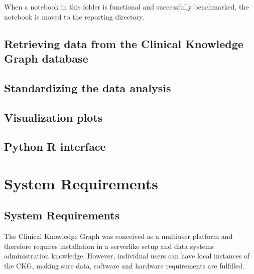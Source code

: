 \documentclass[letterpaper,10pt,english]{sphinxmanual}
\begin{document}
When a notebook in this folder is functional and successfully benchmarked, the notebook is moved to the reporting directory.


\section{Retrieving data from the Clinical Knowledge Graph database}
\label{\detokenize{advanced_features/ckg-queries:retrieving-data-from-the-clinical-knowledge-graph-database}}\label{\detokenize{advanced_features/ckg-queries::doc}}

\section{Standardizing the data analysis}
\label{\detokenize{advanced_features/standard-analysis:standardizing-the-data-analysis}}\label{\detokenize{advanced_features/standard-analysis::doc}}

\section{Visualization plots}
\label{\detokenize{advanced_features/visualization-plots:visualization-plots}}\label{\detokenize{advanced_features/visualization-plots::doc}}

\section{Python \sphinxhyphen{} R interface}
\label{\detokenize{advanced_features/R-interface:python-r-interface}}\label{\detokenize{advanced_features/R-interface::doc}}

\chapter{System Requirements}
\label{\detokenize{index:system-requirements}}

\section{System Requirements}
\label{\detokenize{system_requirements:system-requirements}}\label{\detokenize{system_requirements::doc}}
The Clinical Knowledge Graph was conceived as a multi\sphinxhyphen{}user platform and therefore requires installation in a server\sphinxhyphen{}like setup and data systems administration knowledge. However, individual users can have local instances of the CKG, making sure data, software and hardware requirements are fulfilled.
\end{document}
